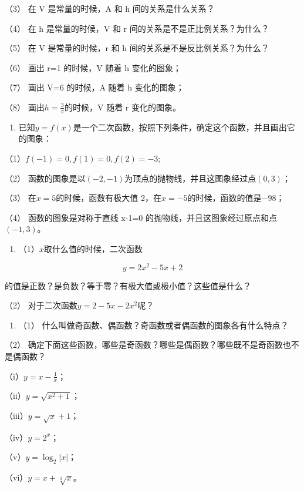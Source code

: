 （3） 在 V 是常量的时候，A 和 h 间的关系是什么关系？

（4） 在 h 是常量的时候，V 和 r 间的关系是不是正比例关系？为什么？

（5） 在 V 是常量的时候，r 和 h 间的关系是不是反比例关系？为什么？

（6） 画出 r=1 的时候，V 随着 h 变化的图象；

（7） 画出 V=6 的时候，A 随着 h 变化的图象；

（8） 画出\(h=\frac{3}{\pi}\)的时候，V 随着 r 变化的图象。

\begin{enumerate}[start=12]
\item
  已知\(y = f(x)\)是一个二次函数，按照下列条件，确定这个函数，并且画出它的图象：
\end{enumerate}

（1）\(f(-1) = 0, f(1) = 0, f(2) = -3;\)

（2）
函数的图象是以\((-2, -1)\)为顶点的抛物线，并且这图象经过点\((0, 3)\)；

（3） 在\(x = 5\)的时候，函数有极大值
2，在\(x = -5\)的时候，函数的值是\(-98\)；

（4） 函数的图象是对称于直线 x-1=0
的抛物线，并且这图象经过原点和点\((-1,3)\)。

\begin{enumerate}[start=13]
\item
  （1）\(x\)取什么值的时候，二次函数
\end{enumerate}

\[
y = 2 x^{2} - 5 x + 2
\]

的值是正数？是负数？等于零？有极大值或极小值？这些值是什么？

（2） 对于二次函数\(y=2-5x-2x^{2}\)呢？

\begin{enumerate}[start=14]
\item
  （1） 什么叫做奇函数、偶函数？奇函数或者偶函数的图象各有什么特点？
\end{enumerate}

（2）
确定下面这些函数，哪些是奇函数？哪些是偶函数？哪些既不是奇函数也不是偶函数？

（i）\(y = x - \frac{1}{x}\)；

（ii）\(y = \sqrt{x^2 + 1}\)；

（iii）\(y = \sqrt{x} + 1\)；

（iv）\(y = 2^{x}\)；

（v）\(y = \log_2 |x|\)；

（vi）\(y = x + \sqrt[3]{x}\)。

